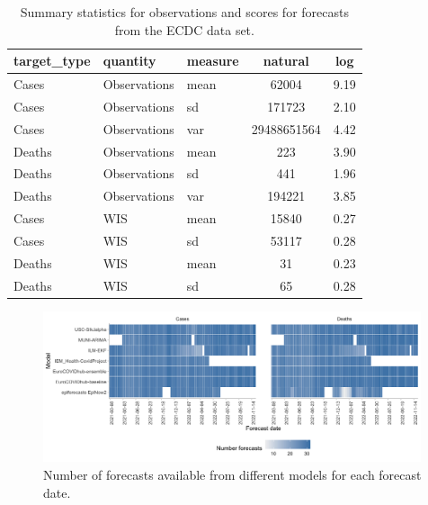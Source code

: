 \documentclass{article}
\begin{document}
\begin{table}[h!]
    \centering
\begin{tabular}{lllcc}
\toprule
target\_type & quantity & measure & natural & log\\
\midrule
Cases & Observations & mean & 62004 & 9.19\\
Cases & Observations & sd & 171723 & 2.10\\
Cases & Observations & var & 29488651564 & 4.42\\
\addlinespace
Deaths & Observations & mean & 223 & 3.90\\
Deaths & Observations & sd & 441 & 1.96\\
Deaths & Observations & var & 194221 & 3.85\\
\addlinespace
\hline
\addlinespace
Cases & WIS & mean & 15840 & 0.27\\
Cases & WIS & sd & 53117 & 0.28\\
\addlinespace
Deaths & WIS & mean & 31 & 0.23\\
Deaths & WIS & sd & 65 & 0.28\\
\bottomrule
\end{tabular}
    \caption{Summary statistics for observations and scores for forecasts from the ECDC data set.}
    \label{tab:HUB-summary}
\end{table}

\begin{figure}[h!]
    \centering
    \includegraphics[width=0.99\textwidth]{output/figures/number-avail-forecasts.png}
    \caption{
    Number of forecasts available from different models for each forecast date. 
    }
    \label{fig:HUB-num-avail-models}
\end{figure}
\end{document}
